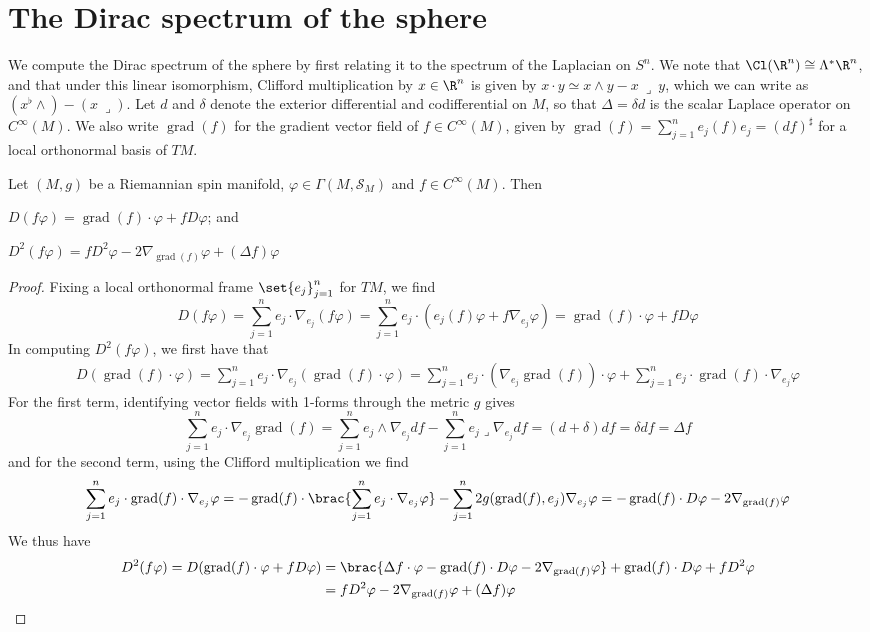 \documentclass[11pt]{report}
\renewcommand{\S}{\mathcal{S}}
\DeclareMathOperator{\grad}{grad}
\begin{document}
\chapter{The Dirac spectrum of the sphere}
\vspace*{-30pt}
We compute the Dirac spectrum of the sphere by first relating it to the spectrum of the Laplacian on $S^n$. We note that $\Cl(\R^n) \cong \Lambda^*\R^n$, and that under this linear isomorphism, Clifford multiplication by $x \in \R^n$ is given by $x \cdot y \simeq x \wedge y - x \ \lrcorner \  y$, which we can write as $(x^\flat \wedge) - (x \ \lrcorner)$. Let $d$ and $\delta$ denote the exterior differential and codifferential on $M$, so that $\Delta = \delta d$ is the scalar Laplace operator on $C^\infty(M)$. We also write $\grad(f)$ for the gradient vector field of $f \in C^\infty(M)$, given by $\grad(f) = \sum_{j = 1}^n e_j(f)e_j = (df)^\sharp$ for a local orthonormal basis of $TM$.
\begin{lemma}
    Let $(M, g)$ be a Riemannian spin manifold, $\varphi \in \Gamma(M, \S_M)$ and $f \in C^\infty(M)$. Then 
    \begin{enum}
        \item $D(f\varphi) = \grad(f) \cdot \varphi + f D\varphi$; and
        \item $D^2(f\varphi) = fD^2\varphi - 2\nabla_{\grad(f)}\varphi + (\Delta f)\varphi$
    \end{enum}
\end{lemma}
\begin{proof}
    Fixing a local orthonormal frame $\set{e_j}_{j = 1}^n$ for $TM$, we find
    $$
        D(f\varphi) = \sum_{j = 1}^n e_j \cdot \nabla_{e_j}(f \varphi) = \sum_{j = 1}^n e_j \cdot (e_j(f)\varphi + f \nabla_{e_j}\varphi) = \grad(f) \cdot \varphi + fD\varphi
    $$
    In computing $D^2(f\varphi)$, we first have that
    \begin{align*}
        D(\grad(f) \cdot \varphi) = \sum_{j = 1}^n e_j \cdot \nabla_{e_j}(\grad(f) \cdot \varphi) = \sum_{j = 1}^n e_j \cdot (\nabla_{e_j}\grad(f)) \cdot \varphi + \sum_{j = 1}^n e_j \cdot \grad(f) \cdot \nabla_{e_j}\varphi
    \end{align*}
    For the first term, identifying vector fields with 1-forms through the metric $g$ gives
    $$
        \sum_{j = 1}^n e_j \cdot \nabla_{e_j}\grad(f) = \sum_{j = 1}^n e_j \wedge \nabla_{e_j}df - \sum_{j = 1}^n e_j \lrcorner \nabla_{e_j}df = (d + \delta)df = \delta df = \Delta f
    $$
    and for the second term, using the Clifford multiplication we find
    $$
        \sum_{j = 1}^n e_j \cdot \grad(f) \cdot \nabla_{e_j}\varphi = -\grad(f) \cdot \brac{\sum_{j = 1}^n e_j \cdot \nabla_{e_j}\varphi} - \sum_{j = 1}^n 2g(\grad(f), e_j)\nabla_{e_j}\varphi = -\grad(f) \cdot D\varphi - 2\nabla_{\grad(f)}\varphi
    $$
    We thus have
    \begin{align*}
        D^2(f\varphi) = D(\grad(f) \cdot \varphi + fD\varphi) &= \brac{\Delta f \cdot \varphi - \grad(f) \cdot D\varphi - 2\nabla_{\grad(f)}\varphi} + \grad(f) \cdot D\varphi + fD^2\varphi \\
        &= fD^2\varphi - 2\nabla_{\grad(f)}\varphi + (\Delta f)\varphi
    \end{align*}
\end{proof}
\end{document}
